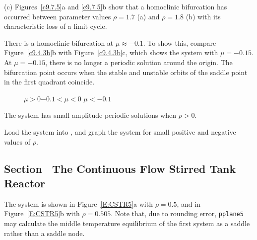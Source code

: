 \documentclass{ximera}
\begin{document}
(c)  Figures~\ref{c9.7.5}a and \ref{c9.7.5}b show that a homoclinic 
bifurcation has occurred between parameter values $\rho=1.7$ (a) and 
$\rho=1.8$ (b) with its characteristic loss of a limit cycle. 

\begin{figure}[htb]
                       \centerline{%
                       }
\end{figure}

There is a homoclinic bifurcation at $\mu \approx -0.1$.  To show this,
compare Figure~\ref{c9.4.3b}b with Figure~\ref{c9.4.3b}c, which shows the
system with $\mu = -0.15$.  At $\mu = -0.15$, there is no longer a periodic
solution around the origin.  The bifurcation point occurs when the stable
and unstable orbits of the saddle point in the first quadrant coincide.

\begin{figure}[htb]
                       \centerline{%
                       }
		\centerline{$\mu > 0$\hspace{1.2in}$-0.1 < \mu < 0$
\hspace{1.2in}$\mu < -0.1$}
\end{figure}

\ans The system has small amplitude periodic solutions when $\rho > 0$.

\soln Load the system into \Matlab, and graph the
system for small positive and negative values of $\rho$.



\subsection*{Section~\protect{\ref{S:CSTR}} The Continuous Flow Stirred Tank
Reactor}

The system is shown in Figure~\ref{E:CSTR5}a with $\rho = 0.5$, and in
Figure~\ref{E:CSTR5}b with $\rho = 0.505$.  Note that, due to rounding
error, {\tt pplane5} may calculate the middle temperature equilibrium of
the first system as a saddle rather than a saddle node.  
\end{document}
